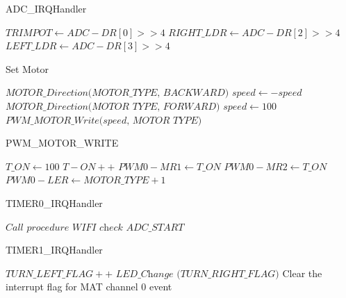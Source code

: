 \documentclass[12pt]{article}
\begin{document}
\begin{algorithm}
\caption{ADC\_IRQHandler}\label{euclid}
\begin{algorithmic}[1]
\Comment{}
    \State $TRIMPOT \gets ADC-DR[0]>>4$
\EndIf
{}
    \State $\textit{RIGHT\_LDR} \gets ADC-DR[2]>>4$
\EndIf
{}
    \State $\textit{LEFT\_LDR} \gets ADC-DR[3]>>4$
\EndIf
\EndProcedure
\end{algorithmic}
\end{algorithm}

\begin{algorithm}
\caption{Set Motor}\label{euclid}
\begin{algorithmic}[1]
\Comment{}
    \State $\textit{MOTOR\_Direction(MOTOR\_TYPE, BACKWARD)}$
    \State $speed \gets -speed$
\Else
    \State $\textit{MOTOR\_Direction(MOTOR TYPE, FORWARD)}$
\EndIf
{}
    \State $speed \gets 100$
\EndIf
\State $\textit{PWM\_MOTOR\_Write(speed, MOTOR TYPE)}$
    
\EndProcedure
\end{algorithmic}
\end{algorithm}

\begin{algorithm}
\caption{PWM\_MOTOR\_WRITE}\label{euclid}
\begin{algorithmic}[1]
\Comment{}
    \State $T\_ON \gets 100$
\EndIf
{}
    \State $T-ON++$
\EndIf
{}
    \State $PWM0-MR1 \gets T\_ON $
\EndIf
{}
    \State $PWM0-MR2 \gets T\_ON $
\EndIf
\State $PWM0-LER \gets MOTOR\_TYPE + 1 $
\EndProcedure
\end{algorithmic}
\end{algorithm}

\begin{algorithm}
\caption{TIMER0\_IRQHandler}\label{euclid}
\begin{algorithmic}[1]
\Comment{}
    \State $\textit{Call procedure WIFI check}$
\EndIf
\State $ADC\_START$
\EndProcedure
\end{algorithmic}
\end{algorithm}

\begin{algorithm}
\caption{TIMER1\_IRQHandler}\label{euclid}
\begin{algorithmic}[1]
\Comment{}

\State $\textit{TURN\_LEFT\_FLAG} ++$
\State $\textit{LED\_Change (TURN\_RIGHT\_FLAG)}$
\EndIf
\State Clear the interrupt flag for MAT channel 0 event

\EndProcedure
\end{algorithmic}
\end{algorithm}
\end{document}
